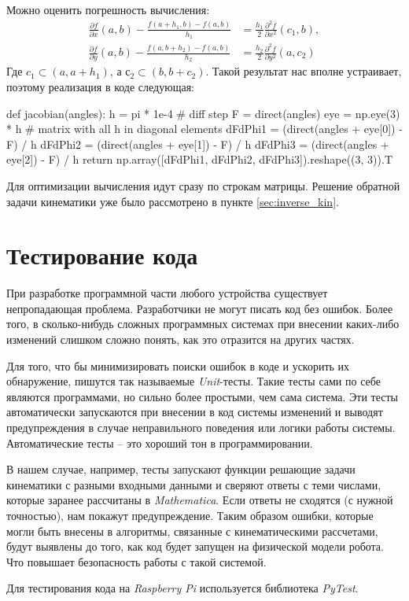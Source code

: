 \noindent Можно оценить погрешность вычисления:
\begin{align*}
    \frac{\partial f}{\partial x}(a, b) - \frac{f(a+h_1, b) - f(a, b)}{h_1} &= \frac{h_1}{2} \frac{\partial^2 f}{\partial x^2}(c_1, b), \\ 
    \frac{\partial f}{\partial y}(a, b) - \frac{f(a, b+h_2) - f(a, b)}{h_2} &= \frac{h_2}{2} \frac{\partial^2 f}{\partial y^2}(a, c_2)
\end{align*}
\noindent Где $ c_1 \subset (a, a+h_1) $, а $ с_2 \subset (b, b+c_2) $. Такой результат нас вполне устраивает, поэтому реализация в коде следующая:
\begin{python}
def jacobian(angles):
    h = pi * 1e-4 # diff step
    F = direct(angles)
    eye = np.eye(3) * h # matrix with all h in diagonal elements
    dFdPhi1 = (direct(angles + eye[0]) - F) / h
    dFdPhi2 = (direct(angles + eye[1]) - F) / h
    dFdPhi3 = (direct(angles + eye[2]) - F) / h
    return np.array([dFdPhi1, dFdPhi2, dFdPhi3]).reshape((3, 3)).T
\end{python}

\noindent Для оптимизации вычисления идут сразу по строкам матрицы.
Решение обратной задачи кинематики уже было рассмотрено в пункте \ref{sec:inverse_kin}.

\section{Тестирование кода}

При разработке программной части любого устройства существует непропадающая проблема. Разработчики не могут писать код без ошибок.
Более того, в сколько-нибудь сложных программных системах при внесении каких-либо изменений слишком сложно понять, как это отразится на других частях.

Для того, что бы минимизировать поиски ошибок в коде и ускорить их обнаружение, пишутся так называемые \textit{Unit}-тесты. Такие тесты сами по себе являются программами, но сильно более простыми, чем сама система. Эти тесты автоматически запускаются при внесении в код системы изменений и выводят предупреждения в случае неправильного поведения или логики работы системы.
Автоматические тесты -- это хороший тон в программировании.

В нашем случае, например, тесты запускают функции решающие задачи кинематики с разными входными данными и сверяют ответы с теми числами, которые заранее рассчитаны в \textit{Mathematica}. Если ответы не сходятся (с нужной точностью), нам покажут предупреждение. Таким образом ошибки, которые могли быть внесены в алгоритмы, связанные с кинематическими рассчетами, будут выявлены до того, как код будет запущен на физической модели робота. Что повышает безопасность работы с такой системой.

Для тестирования кода на \textit{Raspberry Pi} используется библиотека \textit{PyTest}.

